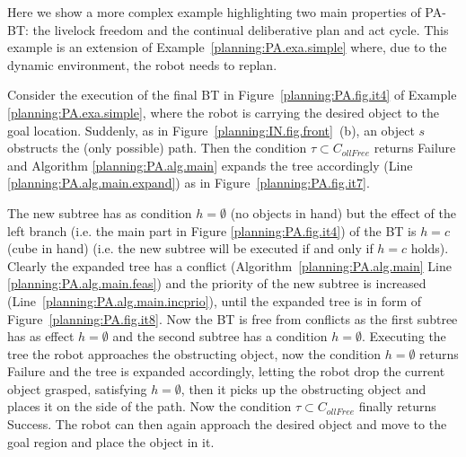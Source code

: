 \begin{example}
\label{planning:PA.exa.complex}

Here we show a more complex example highlighting two main properties of PA-BT: the livelock freedom and the continual deliberative plan and act cycle. This example is an extension of Example~\ref{planning:PA.exa.simple} where, due to the dynamic environment, the robot needs to replan.


Consider the execution of the final BT in Figure~\ref{planning:PA.fig.it4} of Example \ref{planning:PA.exa.simple}, where the robot is carrying the desired object to the goal location. Suddenly, as in Figure~\ref{planning:IN.fig.front}~(b), an object $s$ obstructs the (only possible) path. Then the condition $\tau \subset C_{ollFree}$  returns Failure and Algorithm \ref{planning:PA.alg.main} expands the tree accordingly (Line \ref{planning:PA.alg.main.expand}) as in Figure~\ref{planning:PA.fig.it7}.

The new subtree has as condition $h = \emptyset$ (no objects in hand) but the effect of the left branch (i.e. the main part in Figure \ref{planning:PA.fig.it4}) of the BT is $h = c$ (cube in hand) (i.e. the new subtree will be executed if and only if $h = c$ holds). Clearly  the expanded tree has a conflict (Algorithm~\ref{planning:PA.alg.main} Line \ref{planning:PA.alg.main.feas}) and the priority of the new subtree is increased  (Line~\ref{planning:PA.alg.main.incprio}), until the expanded tree is in form of Figure~\ref{planning:PA.fig.it8}. Now the BT is free from conflicts as the first subtree has as effect $h = \emptyset$  and the second subtree has a condition $h = \emptyset$. Executing the tree the robot approaches the obstructing object, now the condition $h = \emptyset$ returns Failure and the tree is expanded accordingly, letting the robot drop the current object grasped, satisfying $h = \emptyset$, then it picks up the obstructing object and places it on the side of the path. Now the condition $\tau \subset C_{ollFree}$ finally returns Success. The robot can then again approach the desired object and move to the goal region and place the object in it.  

\end{example}



